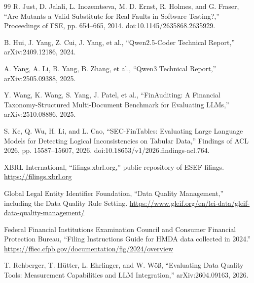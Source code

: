 \documentclass[11pt,a4paper]{article}
\begin{document}
\begin{thebibliography}{99}
 R. Just, D. Jalali, L. Inozemtseva, M. D. Ernst, R. Holmes, and G. Fraser, ``Are Mutants a Valid Substitute for Real Faults in Software Testing?,'' Proceedings of FSE, pp. 654--665, 2014. doi:10.1145/2635868.2635929.

 B. Hui, J. Yang, Z. Cui, J. Yang, et al., ``Qwen2.5-Coder Technical Report,'' arXiv:2409.12186, 2024.

 A. Yang, A. Li, B. Yang, B. Zhang, et al., ``Qwen3 Technical Report,'' arXiv:2505.09388, 2025.

 Y. Wang, K. Wang, S. Yang, J. Patel, et al., ``FinAuditing: A Financial Taxonomy-Structured Multi-Document Benchmark for Evaluating LLMs,'' arXiv:2510.08886, 2025.

 S. Ke, Q. Wu, H. Li, and L. Cao, ``SEC-FinTables: Evaluating Large Language Models for Detecting Logical Inconsistencies on Tabular Data,'' Findings of ACL 2026, pp. 15587--15607, 2026. doi:10.18653/v1/2026.findings-acl.764.

 XBRL International, ``filings.xbrl.org,'' public repository of ESEF filings. \url{https://filings.xbrl.org}

 Global Legal Entity Identifier Foundation, ``Data Quality Management,'' including the Data Quality Rule Setting. \url{https://www.gleif.org/en/lei-data/gleif-data-quality-management/}

 Federal Financial Institutions Examination Council and Consumer Financial Protection Bureau, ``Filing Instructions Guide for HMDA data collected in 2024.'' \url{https://ffiec.cfpb.gov/documentation/fig/2024/overview}

 T. Rehberger, T. H\"utter, L. Ehrlinger, and W. W\"o{\ss}, ``Evaluating Data Quality Tools: Measurement Capabilities and LLM Integration,'' arXiv:2604.09163, 2026.

\end{thebibliography}
\end{document}
